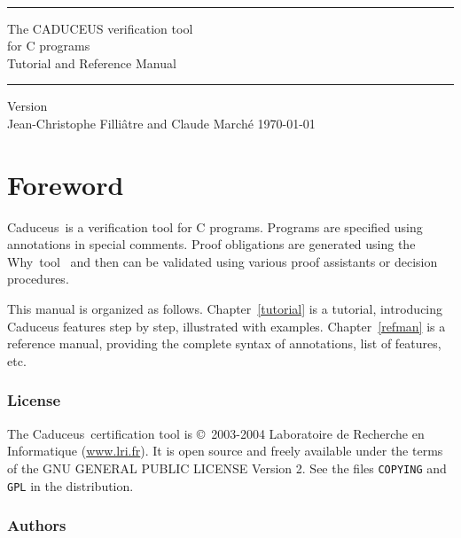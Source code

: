 \documentclass[12pt,a4paper,twoside,openright]{report}
\newcommand{\why}{\textsf{Why}}
\newcommand{\caduceus}{\textsf{Caduceus}}
\begin{document}
\sloppy

\thispagestyle{empty}
\begin{center}
~\\[3cm]
\rule\textwidth{0.1cm}\\[0.5cm]
{\Huge\sf The CADUCEUS verification tool \\[0.5em] for C programs}\\[1cm]
{\Large\sf Tutorial and Reference Manual}\\[0.1cm]
\rule\textwidth{0.1cm}\\[1cm]
Version \caduceusversion\\[3cm]
Jean-Christophe Filli\^atre and Claude March\'e
\vfill
\today\\
\end{center}


\chapter*{Foreword}

\caduceus\ is a verification tool for C programs. Programs are
specified using annotations in special comments. Proof obligations are
generated using the \why\ tool~\cite{Why} and then can be validated using
various proof assistants or decision procedures.

\medskip

This manual is organized as follows. Chapter~\ref{tutorial} is a
tutorial, introducing \caduceus{} features step by step, illustrated
with examples. Chapter~\ref{refman} is a reference manual, providing
the complete syntax of annotations, list of features, etc.

\subsection*{License}

The \caduceus\ certification tool is \copyright\ 2003-2004 Laboratoire de
Recherche en Informatique (\url{www.lri.fr}).
It is open source and freely available under the terms of the GNU
GENERAL PUBLIC LICENSE Version 2. See the files \texttt{COPYING} and
\texttt{GPL} in the distribution.

\subsection*{Authors}
\end{document}
